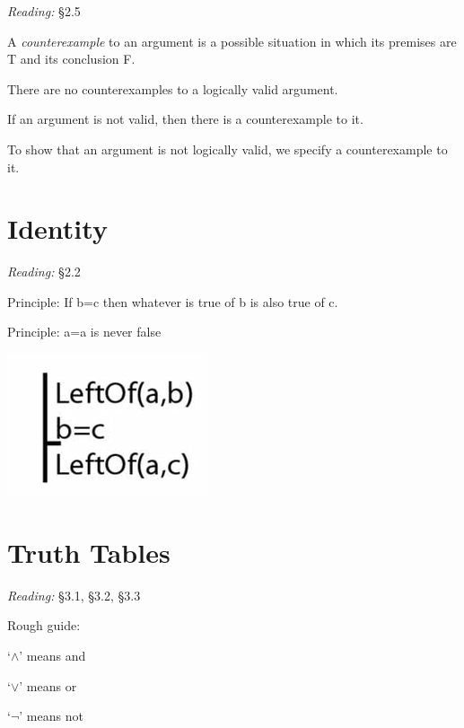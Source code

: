 \documentclass[12pt]{extarticle}
\begin{document}
\begin{multicols*}{3}
\emph{Reading:} §2.5
 
A \emph{counterexample} to an argument is a possible situation in which its premises are T and its conclusion F.
 
There are no counterexamples to a logically valid argument.
 
If an argument is not valid, then there is a counterexample to it.
 
To show that an argument is not logically valid, we specify a counterexample to it.
 
 
 
\section{Identity}
 
\emph{Reading:} §2.2
 
Principle: If b=c then whatever is true of b is also true of c.
 
Principle: a=a is never false
 
\begin{center}
\includegraphics[scale=0.3]{img/arg_identity.png}
\end{center}
 
 
\section{Truth Tables}
 
\emph{Reading:} §3.1, §3.2, §3.3
 
Rough guide:
 
`$\land{}$' means and
 
`$\lor{}$' means or
 
`$\lnot{}$' means not
 

\end{multicols*}
\end{document}
